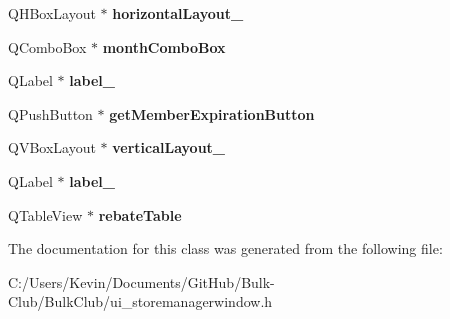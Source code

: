 \begin{DoxyCompactItemize}
\item 
\mbox{\label{class_ui___store_manager_window_aa72fb234d13f15256327d7dcdf9efc48}} 
Q\+H\+Box\+Layout $\ast$ {\bfseries horizontal\+Layout\+\_}
\item 
\mbox{\label{class_ui___store_manager_window_aec9aef32cce56bc042be81d4fa91e43a}} 
Q\+Combo\+Box $\ast$ {\bfseries month\+Combo\+Box}
\item 
\mbox{\label{class_ui___store_manager_window_a675b39ccb229059288581207cc2d9999}} 
Q\+Label $\ast$ {\bfseries label\+\_}
\item 
\mbox{\label{class_ui___store_manager_window_a0bcd60c56336942419705bf30ef58bc3}} 
Q\+Push\+Button $\ast$ {\bfseries get\+Member\+Expiration\+Button}
\item 
\mbox{\label{class_ui___store_manager_window_a8fac09b885827204c30271a58e585c1f}} 
Q\+V\+Box\+Layout $\ast$ {\bfseries vertical\+Layout\+\_}
\item 
\mbox{\label{class_ui___store_manager_window_af0c532eb80534e9e886692ae52bce607}} 
Q\+Label $\ast$ {\bfseries label\+\_}
\item 
\mbox{\label{class_ui___store_manager_window_aa8edf49aec4057dd33c01e684f8bafe1}} 
Q\+Table\+View $\ast$ {\bfseries rebate\+Table}
\end{DoxyCompactItemize}


The documentation for this class was generated from the following file\+:\begin{DoxyCompactItemize}
\item 
C\+:/\+Users/\+Kevin/\+Documents/\+Git\+Hub/\+Bulk-\/\+Club/\+Bulk\+Club/ui\+\_\+storemanagerwindow.\+h\end{DoxyCompactItemize}
